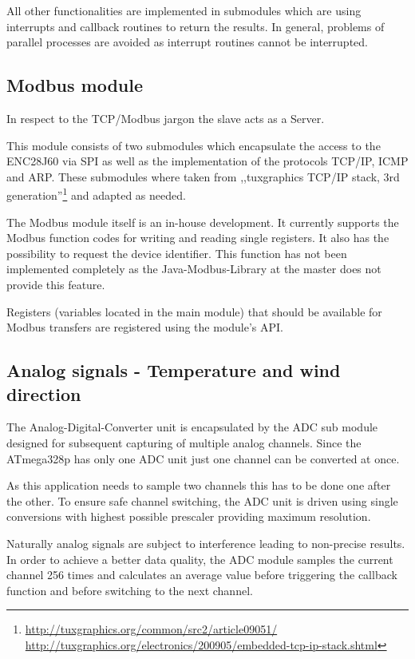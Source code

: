 All other functionalities are implemented in submodules which are using interrupts and callback routines to return the results. In general, problems of parallel processes are avoided as interrupt routines cannot be interrupted.

\subsection{Modbus module}
In respect to the TCP/Modbus jargon the slave acts as a Server.

This module consists of two submodules which encapsulate the access to the ENC28J60 via SPI as well as the implementation of the protocols TCP/IP, ICMP and ARP. These submodules where taken from ,,tuxgraphics TCP/IP stack, 3rd generation''\footnote{\url{http://tuxgraphics.org/common/src2/article09051/} \url{http://tuxgraphics.org/electronics/200905/embedded-tcp-ip-stack.shtml}} and adapted as needed.

The Modbus module itself is an in-house development. It currently supports the Modbus function codes for writing and reading single registers. It also has the possibility to request the device identifier. This function has not been implemented completely as the Java-Modbus-Library at the master does not provide this feature.

Registers (variables located in the main module) that should be available for Modbus transfers are registered using the module's API.

\subsection{Analog signals - Temperature and wind direction}
The Analog-Digital-Converter unit is encapsulated by the ADC sub module designed for subsequent capturing of multiple analog channels.
Since the ATmega328p has only one ADC unit just one channel can be converted at once.

As this application needs to sample two channels this has to be done one after the other. To ensure safe channel switching, the ADC unit is driven using single conversions with highest possible prescaler providing maximum resolution.

Naturally analog signals are subject to interference leading to non-precise results. In order to achieve a better data quality, the ADC module samples the current channel 256 times and calculates an average value before triggering the callback function and before switching to the next channel.

